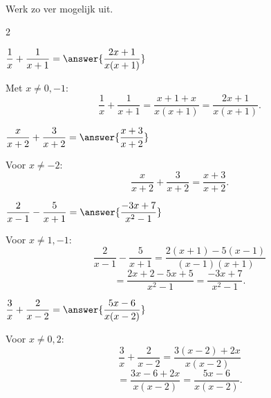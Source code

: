 \documentclass{ximera}
\begin{document}
        \begin{oefening}{\oefB}
            \\
            
            Werk zo ver mogelijk uit.
            
            \begin{multicols}{2}
            
            \begin{question}
            $\dfrac1x+\dfrac1{x+1}
            =\answer{\dfrac{2x+1}{x(x+1)}}$
            
            \begin{oplossing}
            Met $x\neq0,-1$:
            \[
            \dfrac1x+\dfrac1{x+1}
            =\dfrac{x+1+x}{x(x+1)}
            =\dfrac{2x+1}{x(x+1)}.
            \]
            \end{oplossing}
            \end{question}
            
            
            \begin{question}
            $\dfrac{x}{x+2}+\dfrac3{x+2}
            =\answer{\dfrac{x+3}{x+2}}$
            
            \begin{oplossing}
            Voor $x\neq-2$:
            \[
            \dfrac{x}{x+2}+\dfrac3{x+2}
            =\dfrac{x+3}{x+2}.
            \]
            \end{oplossing}
            \end{question}
            
            
            \begin{question}
            $\dfrac2{x-1}-\dfrac5{x+1}
            =\answer{\dfrac{-3x+7}{x^2-1}}$
            
            \begin{oplossing}
            Voor $x\neq1,-1$:
            \[
            \dfrac2{x-1}-\dfrac5{x+1}
            =\dfrac{2(x+1)-5(x-1)}{(x-1)(x+1)}
            \]
            \[
            =\dfrac{2x+2-5x+5}{x^2-1}
            =\dfrac{-3x+7}{x^2-1}.
            \]
            \end{oplossing}
            \end{question}
            
            
            \begin{question}
            $\dfrac3x+\dfrac2{x-2}
            =\answer{\dfrac{5x-6}{x(x-2)}}$
            
            \begin{oplossing}
            Voor $x\neq0,2$:
            \[
            \dfrac3x+\dfrac2{x-2}
            =\dfrac{3(x-2)+2x}{x(x-2)}
            \]
            \[
            =\dfrac{3x-6+2x}{x(x-2)}
            =\dfrac{5x-6}{x(x-2)}.
            \]
            \end{oplossing}
            \end{question}
            

\end{multicols}
\end{oefening}
\end{document}
